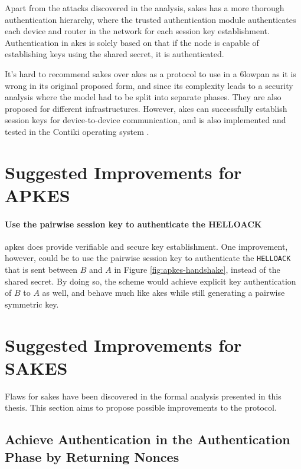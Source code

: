 Apart from the attacks discovered in the analysis, \gls{sakes} has a more thorough authentication hierarchy, where the trusted authentication module authenticates each device and router in the network for each session key establishment. Authentication in \gls{akes} is solely based on that if the node is capable of establishing keys using the shared secret, it is authenticated.

It's hard to recommend \gls{sakes} over \gls{akes} as a protocol to use in a \gls{6lowpan} as it is wrong in its original proposed form, and since its complexity leads to a security analysis where the model had to be split into separate phases. They are also proposed for different infrastructures. However, \gls{akes} can successfully establish session keys for device-to-device communication, and is also implemented and tested in the Contiki operating system \cite{krentz2015handling}.


\section{Suggested Improvements for APKES}

\paragraph{Use the pairwise session key to authenticate the HELLOACK}
\gls{apkes} does provide verifiable and secure key establishment. One improvement, however, could be to use the pairwise session key to authenticate the \texttt{HELLOACK} that is sent between $B$ and $A$ in Figure \ref{fig:apkes-handshake}, instead of the shared secret. By doing so, the scheme would achieve explicit key authentication of $B$ to $A$ as well, and behave much like \gls{akes} while still generating a pairwise symmetric key.


\section{Suggested Improvements for SAKES}
\label{subsec:sakes-fix}

Flaws for \gls{sakes} have been discovered in the formal analysis presented in this thesis. This section aims to propose possible improvements to the protocol.

\subsection{Achieve Authentication in the Authentication Phase by Returning Nonces}

